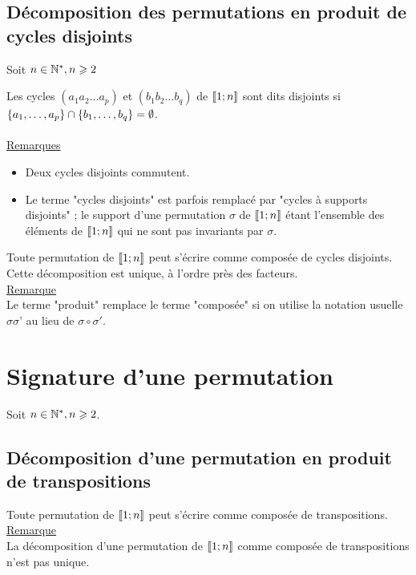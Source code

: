\subsection{Décomposition des permutations en produit de cycles disjoints}
    Soit \(n \in \mathbb{N}^*, n \geqslant 2\)
\begin{defprop}
    Les cycles \((a_1a_2\dots a_p)\) et \((b_1b_2\dots b_q)\) de \(\left\llbracket1;n\right\rrbracket\) sont dits disjoints si \(\left\lbrace a_1,\dots , a_p\right\rbrace \cap \left\lbrace b_1,\dots , b_q\right\rbrace = \emptyset\).\\~\\
    \underline{Remarques}\\
    \begin{itemize}
        \item Deux cycles disjoints commutent.
        \item Le terme "cycles disjoints" est parfois remplacé par "cycles à supports disjoints" ; le support d’une permutation \(\sigma\) de \(\left\llbracket1;n\right\rrbracket\) étant l’ensemble des éléments de \(\left\llbracket1;n\right\rrbracket\) qui ne sont pas invariants par \(\sigma\).
    \end{itemize}
\end{defprop}
\begin{defprop}
    Toute permutation de \(\left\llbracket1;n\right\rrbracket\) peut s’écrire comme composée de cycles disjoints. Cette décomposition est unique, à l’ordre près des facteurs.\\
    \underline{Remarque}\\
    Le terme "produit" remplace le terme "composée" si on utilise la notation usuelle \(\sigma\sigma’\) au lieu de \(\sigma \circ \sigma'\).
\end{defprop}
\section{Signature d’une permutation}
    Soit \(n \in \mathbb{N}^*, n \geqslant 2\).
\subsection{Décomposition d’une permutation en produit de transpositions}
\begin{defprop}
    Toute permutation de \(\left\llbracket1;n\right\rrbracket\) peut s’écrire comme composée de transpositions.\\
    \underline{Remarque}\\
    La décomposition d’une permutation de \(\left\llbracket1;n\right\rrbracket\) comme composée de transpositions n’est pas unique.
\end{defprop}
